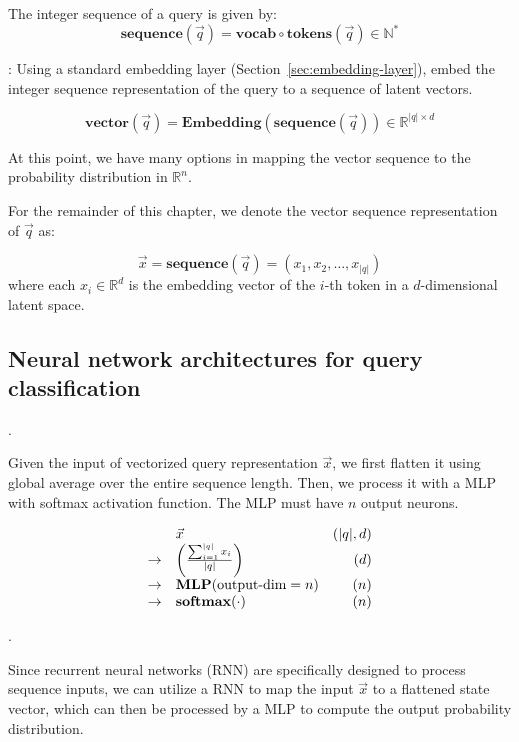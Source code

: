 The integer sequence of a query is given by:
$$
\mathbf{sequence}(\vec q) = \mathbf{vocab}\circ\mathbf{tokens} (\vec q) \in\mathbb{N}^*
$$

:
Using a standard embedding layer (Section~\ref{sec:embedding-layer}), embed the integer sequence representation of the query
to a sequence of latent vectors.

$$
\mathbf{vector}(\vec q) = \mathbf{Embedding}(\mathbf{sequence}(\vec q))\in\mathbb{R}^{|q|\times d}
$$

At this point, we have many options in mapping
the vector sequence to the probability distribution
in $\mathbb{R}^n$.

For the remainder of this chapter, we denote the vector sequence representation of $\vec q$ as:

$$\vec x = \mathbf{sequence}(\vec q) = (x_1, x_2, \dots, x_{|q|})$$
where each $x_i\in\mathbb{R}^d$ is the embedding vector 
of the $i$-th token in a $d$-dimensional latent space.

\subsection{Neural network architectures for query classification}
\label{sec:architectures}

.

Given the input of vectorized query representation $\vec x$, 
we first flatten it using global average over the entire sequence length.  Then, we process it with a MLP with softmax
activation function.  The MLP must have $n$ output neurons.

$$
\begin{array}{rlr}
&\vec x  & (|q|, d) \\
\to & \left(\frac{\sum_{i=1}^{|q|} x_i}{|q|}\right) & (d) \\
\to & \mathbf{MLP}(\makebox{output-dim}=n) & (n) \\
\to & \mathbf{softmax}(\cdot) & (n) \\
\end{array}
$$

.

Since recurrent neural networks (RNN) are specifically designed to process sequence inputs, we can utilize
a RNN to map the input $\vec x$ to a flattened state vector, which can then be processed
by a MLP to compute the output probability distribution.

